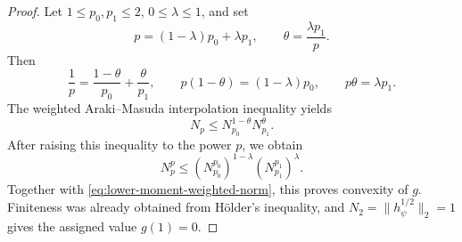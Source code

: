 \documentclass[12pt]{article}
\numberwithin{equation}{section}
\theoremstyle{definition}
\theoremstyle{remark}
\newcommand{\?}{\overset{?}{=}}
\begin{document}
\begin{proof}
Let $1\leq p_0,p_1\leq2$, $0\leq\lambda\leq1$, and set
\begin{equation}
  p=(1-\lambda)p_0+\lambda p_1,
  \qquad
  \theta=\frac{\lambda p_1}{p}.
\end{equation}
Then
\begin{equation}
  \frac1p=\frac{1-\theta}{p_0}
          +\frac{\theta}{p_1},
  \qquad
  p(1-\theta)=(1-\lambda)p_0,
  \qquad p\theta=\lambda p_1.
\end{equation}
The weighted Araki--Masuda interpolation inequality
\cite[Proposition~4]{Berta:2016vnw} yields
\begin{equation}
  N_p\leq N_{p_0}^{1-\theta}N_{p_1}^{\theta}.
\end{equation}
After raising this inequality to the power $p$, we obtain
\begin{equation}
  N_p^p
  \leq (N_{p_0}^{p_0})^{1-\lambda}
       (N_{p_1}^{p_1})^\lambda.
\end{equation}
Together with \eqref{eq:lower-moment-weighted-norm}, this proves convexity
of $g$.  Finiteness was already obtained from H\"older's inequality, and
$N_2=\|h_\psi^{1/2}\|_2=1$ gives the assigned value $g(1)=0$.


\end{proof}
\end{document}
